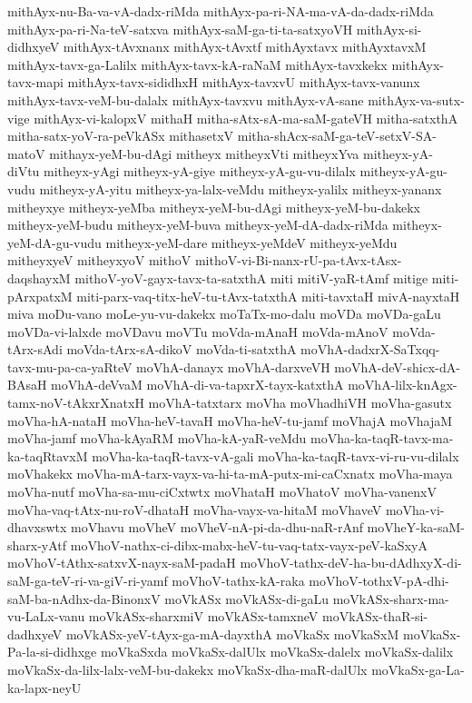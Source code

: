 {mithAyx-nu-Ba-va-vA-dadx-riMda
mithAyx-pa-ri-NA-ma-vA-da-dadx-riMda
mithAyx-pa-ri-Na-teV-satxva
mithAyx-saM-ga-ti-ta-satxyoVH
mithAyx-si-didhxyeV
mithAyx-tAvxnanx
mithAyx-tAvxtf
mithAyxtavx
mithAyxtavxM
mithAyx-tavx-ga-Lalilx
mithAyx-tavx-kA-raNaM
mithAyx-tavxkekx
mithAyx-tavx-mapi
mithAyx-tavx-sididhxH
mithAyx-tavxvU
mithAyx-tavx-vanunx
mithAyx-tavx-veM-bu-dalalx
mithAyx-tavxvu
mithAyx-vA-sane
mithAyx-va-sutx-vige
mithAyx-vi-kalopxV
mithaH
mitha-sAtx-sA-ma-saM-gateVH
mitha-satxthA
mitha-satx-yoV-ra-peVkASx
mithasetxV
mitha-shAcx-saM-ga-teV-setxV-SA-matoV
mithayx-yeM-bu-dAgi
mitheyx
mitheyxVti
mitheyxYva
mitheyx-yA-diVtu
mitheyx-yAgi
mitheyx-yA-giye
mitheyx-yA-gu-vu-dilalx
mitheyx-yA-gu-vudu
mitheyx-yA-yitu
mitheyx-ya-lalx-veMdu
mitheyx-yalilx
mitheyx-yananx
mitheyxye
mitheyx-yeMba
mitheyx-yeM-bu-dAgi
mitheyx-yeM-bu-dakekx
mitheyx-yeM-budu
mitheyx-yeM-buva
mitheyx-yeM-dA-dadx-riMda
mitheyx-yeM-dA-gu-vudu
mitheyx-yeM-dare
mitheyx-yeMdeV
mitheyx-yeMdu
mitheyxyeV
mitheyxyoV
mithoV
mithoV-vi-Bi-nanx-rU-pa-tAvx-tAsx-daqshayxM
mithoV-yoV-gayx-tavx-ta-satxthA
miti
mitiV-yaR-tAmf
mitige
miti-pArxpatxM
miti-parx-vaq-titx-heV-tu-tAvx-tatxthA
miti-tavxtaH
mivA-nayxtaH
miva
moDu-vano
moLe-yu-vu-dakekx
moTaTx-mo-dalu
moVDa
moVDa-gaLu
moVDa-vi-lalxde
moVDavu
moVTu
moVda-mAnaH
moVda-mAnoV
moVda-tArx-sAdi
moVda-tArx-sA-dikoV
moVda-ti-satxthA
moVhA-dadxrX-SaTxqq-tavx-mu-pa-ca-yaRteV
moVhA-danayx
moVhA-darxveVH
moVhA-deV-shicx-dA-BAsaH
moVhA-deVvaM
moVhA-di-va-tapxrX-tayx-katxthA
moVhA-lilx-knAgx-tamx-noV-tAkxrXnatxH
moVhA-tatxtarx
moVha
moVhadhiVH
moVha-gasutx
moVha-hA-nataH
moVha-heV-tavaH
moVha-heV-tu-jamf
moVhajA
moVhajaM
moVha-jamf
moVha-kAyaRM
moVha-kA-yaR-veMdu
moVha-ka-taqR-tavx-ma-ka-taqRtavxM
moVha-ka-taqR-tavx-vA-gali
moVha-ka-taqR-tavx-vi-ru-vu-dilalx
moVhakekx
moVha-mA-tarx-vayx-va-hi-ta-mA-putx-mi-caCxnatx
moVha-maya
moVha-nutf
moVha-sa-mu-ciCxtwtx
moVhataH
moVhatoV
moVha-vanenxV
moVha-vaq-tAtx-nu-roV-dhataH
moVha-vayx-va-hitaM
moVhaveV
moVha-vi-dhavxswtx
moVhavu
moVheV
moVheV-nA-pi-da-dhu-naR-rAnf
moVheY-ka-saM-sharx-yAtf
moVhoV-nathx-ci-dibx-mabx-heV-tu-vaq-tatx-vayx-peV-kaSxyA
moVhoV-tAthx-satxvX-nayx-saM-padaH
moVhoV-tathx-deV-ha-bu-dAdhxyX-di-saM-ga-teV-ri-va-giV-ri-yamf
moVhoV-tathx-kA-raka
moVhoV-tothxV-pA-dhi-saM-ba-nAdhx-da-BinonxV
moVkASx
moVkASx-di-gaLu
moVkASx-sharx-ma-vu-LaLx-vanu
moVkASx-sharxmiV
moVkASx-tamxneV
moVkASx-thaR-si-dadhxyeV
moVkASx-yeV-tAyx-ga-mA-dayxthA
moVkaSx
moVkaSxM
moVkaSx-Pa-la-si-didhxge
moVkaSxda
moVkaSx-dalUlx
moVkaSx-dalelx
moVkaSx-dalilx
moVkaSx-da-lilx-lalx-veM-bu-dakekx
moVkaSx-dha-maR-dalUlx
moVkaSx-ga-La-ka-lapx-neyU
}
